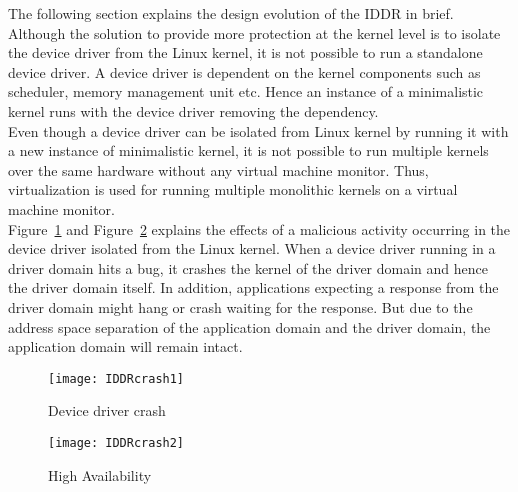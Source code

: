 The following section explains the design evolution of the IDDR in brief. 
\\
Although the solution to provide more protection at the kernel level is to isolate the device driver from the Linux kernel, it is not possible to run a standalone device driver. A device driver is dependent on the kernel components such as scheduler, memory management unit etc. Hence an instance of a minimalistic kernel runs with the device driver removing the dependency. 
\\
Even though a device driver can be isolated from Linux kernel by running it with a new instance of minimalistic kernel, it is not possible to run multiple kernels over the same hardware without any virtual machine monitor. Thus, virtualization is used for running multiple monolithic kernels on a virtual machine monitor.
\\
Figure~\ref{fig:driver crash} and Figure~\ref{fig:high avail} explains the effects of a malicious activity occurring in the device driver isolated from the Linux kernel. When a device driver running in a driver domain hits a bug, it crashes the kernel of the driver domain and hence the driver domain itself. In addition, applications expecting a response from the driver domain might hang or crash waiting for the response. But due to the address space separation of the application domain and the driver domain, the application domain will remain intact.   
\begin{figure}[!ht]
\centering
\texttt{[image: IDDRcrash1]}
\caption{Device driver crash}
\label{fig:driver crash}
\end{figure}
\begin{figure}[!ht]
\centering
\texttt{[image: IDDRcrash2]}
\caption{High Availability}
\label{fig:high avail}
\end{figure}
    
